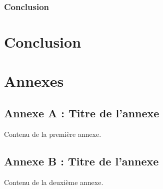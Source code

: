 \documentclass[11pt]{report}
\theoremstyle{definition}
\theoremstyle{remark}
\begin{document}
        \subsection{Conclusion}                         

\chapter{Conclusion}

\newpage

\printbibliography
{}

\newpage

\appendix
\chapter*{Annexes}
\section{Annexe A : Titre de l'annexe}
Contenu de la première annexe.

\section{Annexe B : Titre de l'annexe}
Contenu de la deuxième annexe.

\end{document}
